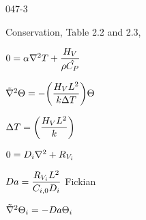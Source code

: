 \begin{mitframe} {047-3}

\begin{listone}
		\item Conservation, Table 2.2 and 2.3,
        
        		\begin{listtwo}
                		\item $0=\tdiff\nabla^2\Temp+\dfrac{\energysource}{\dens\hat{\cp}}$
                        	\begin{listthree}
                            		\item $\tilde{\nabla}^2\dimltemp=-\bigg(\dfrac{\energysource\length^2}{\thermcond\iipf\Temp}\bigg)\dimltemp$
                                    \item $\iipf\Temp=\bigg(\dfrac{\energysource\length^2}{\thermcond}\bigg)$
                            \end{listthree}
               \item $0=\pdiff\nabla^2+\gasconst_{\vol_{\state}}$
               
               				\begin{listthree}
                            		\item $\damkohler=\dfrac{\gasconst_{\vol_{\state}}\length^2}{\conc_{\state,0}\pdiff}$ Fickian
                                    \item $\tilde{\nabla}^2\dimltemp_{\state}=-\damkohler\dimltemp_{\state}$
                                    
                            \end{listthree}
               \end{listtwo}
\end{listone}
\end{mitframe}